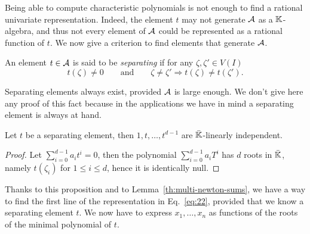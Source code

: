Being able to compute characteristic polynomials is not enough to find
a rational univariate representation. Indeed, the element $t$ may not
generate $\mathcal{A}$ as a $\mathbb{K}$-algebra, and thus not every element of
$\mathcal{A}$ could be represented as a rational function of $t$. We now
give a criterion to find elements that generate $\mathcal{A}$.

\begin{definition}
  An element $t\in\mathcal{A}$ is said to be \emph{separating} if for
  any $\zeta,\zeta'\in V(I)$
  \[t(\zeta)\ne0 \qquad\text{and}\qquad \zeta\ne\zeta'\Rightarrow t(\zeta)\ne t(\zeta')\text{.}\]
\end{definition}

Separating elements always exist, provided $\mathcal{A}$ is large
enough. We don't give here any proof of this fact because in the
applications we have in mind a separating element is always at hand.

\begin{proposition}
  Let $t$ be a separating element, then $1,t,\ldots,t^{d-1}$ are
  $\bar{\mathbb{K}}$-linearly independent.
\end{proposition}
\begin{proof}
  Let $\sum_{i=0}^{d-1}a_it^i =0$, then the polynomial
  $\sum_{i=0}^{d-1}a_iT^i$ has $d$ roots in $\bar{\mathbb{K}}$, namely
  $t(\zeta_i)$ for $1\le i \le d$, hence it is identically null.
\end{proof}

Thanks to this proposition and to Lemma~\ref{th:multi-newton-sums}, we
have a way to find the first line of the representation in
Eq.~\eqref{eq:22}, provided that we know a separating element $t$. We
now have to express $x_1,\ldots,x_n$ as functions of the roots of the
minimal polynomial of $t$.


